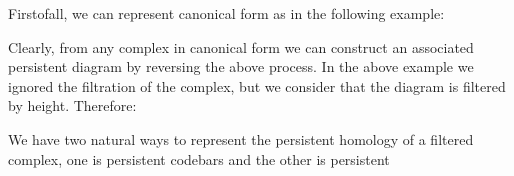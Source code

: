 
Firstofall, we can represent canonical form as in the following example:



Clearly, from any complex in canonical form we can construct an associated persistent diagram by reversing the above process.
In the above example we ignored the filtration of the complex, but we consider that the diagram is filtered by height.
 Therefore:

%
%



%


We have two natural ways to represent the persistent homology of a 
filtered complex, one is persistent codebars and the other is persistent 

